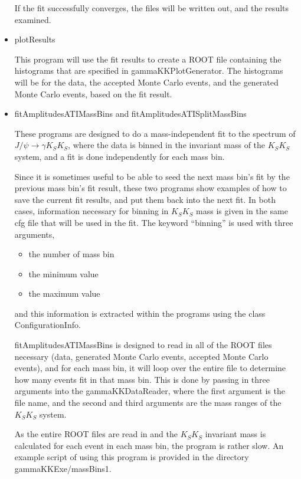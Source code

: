 \documentclass[11pt]{article}
\begin{document}
\begin{itemize}
    If the fit successfully converges, the files will be written out,
    and the results examined.

  \item plotResults

    This program will use the fit results to create a ROOT file
    containing the histograms that are specified in
    gammaKKPlotGenerator. The histograms will be for the data, the
    accepted Monte Carlo events, and the generated Monte Carlo events,
    based on the fit result.

  \item fitAmplitudesATIMassBins and fitAmplitudesATISplitMassBins

    These programs are designed to do a mass-independent fit to the
    spectrum of $J/\psi \to \gamma K_{S} K_{S}$, where the data is
    binned in the invariant mass of the $K_{S} K_{S}$ system, and a
    fit is done independently for each mass bin.

    Since it is sometimes useful to be able to seed the next mass
    bin's fit by the previous mass bin's fit result, these two
    programs show examples of how to save the current fit results, and
    put them back into the next fit. In both cases, information
    necessary for binning in $K_{S} K_{S}$ mass is given in the same
    cfg file that will be used in the fit. The keyword ``binning'' is
    used with three arguments,
    \begin{itemize}
      \item the number of mass bin
      \item the minimum value
      \item the maximum value
    \end{itemize}
    and this information is extracted within the programs using the
    class ConfigurationInfo.

    fitAmplitudesATIMassBins is designed to read in all of the ROOT
    files necessary (data, generated Monte Carlo events, accepted
    Monte Carlo events), and for each mass bin, it will loop over the
    entire file to determine how many events fit in that mass bin.
    This is done by passing in three arguments into the
    gammaKKDataReader, where the first argument is the file name, and
    the second and third arguments are the mass ranges of the $K_{S}
    K_{S}$ system.

    As the entire ROOT files are read in and the $K_{S} K_{S}$
    invariant mass is calculated for each event in each mass bin, the
    program is rather slow. An example script of using this program is
    provided in the directory gammaKKExe/massBins1.


\end{itemize}
\end{document}
